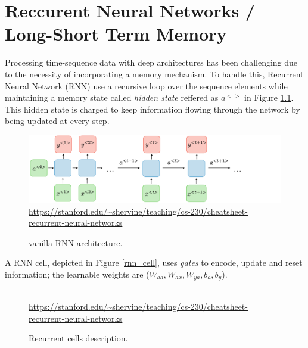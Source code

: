 \documentclass[12pt, a4paper]{report}
\begin{document}
	\chapter{Reccurent Neural Networks / Long-Short Term Memory}\label{appendix_b}
		Processing time-sequence data with deep architectures has been challenging due to the necessity of incorporating a memory mechanism.
		To handle this, Recurrent Neural Network (RNN) use a recursive loop over the sequence elements while maintaining a memory state called {\itshape hidden state} reffered as {\itshape $a^{<>}$} in Figure \ref{rnn}.
		This hidden state is charged to keep information flowing through the network by being updated at every step.
		\begin{figure}[h!]
			\centering
			\includegraphics[width=1.\textwidth]{architecture-rnn-ltr.png}
			{\tiny \url{https://stanford.edu/~shervine/teaching/cs-230/cheatsheet-recurrent-neural-networks}}
			\caption{vanilla RNN architecture.}
			\label{rnn}
		\end{figure}
		A RNN cell, depicted in Figure \ref{rnn_cell}, uses {\itshape gates} to encode, update and reset information; the learnable weights are ({\itshape $W_{aa},W_{ax},W_{ya},b_{a},b_{y}$}).
		\begin{figure}[h!]
			\centering
			\hfill
			 \\
			{\tiny \url{https://stanford.edu/~shervine/teaching/cs-230/cheatsheet-recurrent-neural-networks}}
			\caption{Recurrent cells description.}
		\end{figure}
\end{document}
